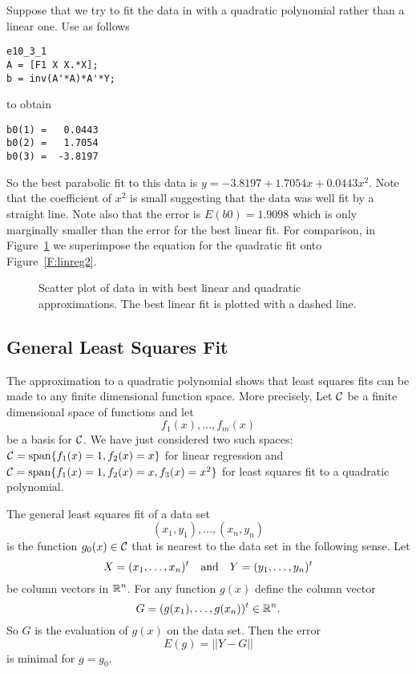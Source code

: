 \documentclass{ximera}
\begin{document}
Suppose that we try to fit the data in  with a quadratic
polynomial rather than a linear one.   Use \Matlab as follows
\begin{verbatim}
e10_3_1
A = [F1 X X.*X];
b = inv(A'*A)*A'*Y;
\end{verbatim}
to obtain
\begin{verbatim}
b0(1) =   0.0443
b0(2) =   1.7054
b0(3) =  -3.8197
\end{verbatim}
So the best parabolic fit
to this data is $y=-3.8197+1.7054x+0.0443x^2$.
Note that the coefficient of $x^2$ is small suggesting that the data was
well fit by a straight line.  Note also that the error is
$E(b0)=1.9098$ which
is only marginally smaller than the error for the best linear fit.  For
comparison, in Figure~\ref{F:linreg3} we superimpose the equation for the
quadratic fit onto Figure~\ref{F:linreg2}.
\begin{figure}[htb]
     \centerline{%
     }
     \caption{Scatter plot of data in \protect{} with best
	linear and quadratic approximations.  The best linear fit is plotted
	with a dashed line.}
     \label{F:linreg3}
\end{figure}



\subsection*{General Least Squares Fit}

The approximation to a quadratic polynomial shows that least squares
fits can be made to any finite dimensional
function space.  More precisely,
Let ${\cal C}$ be a finite dimensional space of functions and let
\[
f_1(x),\ldots,f_m(x)
\]
be a basis for ${\cal C}$.  We have just considered two such spaces:
${\cal C}={\rm span}\{f_1(x)=1,f_2(x)=x\}$ for
linear regression and
${\cal C}={\rm span}\{f_1(x)=1,f_2(x)=x,f_3(x)=x^2\}$ for
least squares fit to a
quadratic polynomial.

The general least squares fit of a data set
\[
(x_1,y_1),\ldots, (x_n,y_n)
\]
is the function $g_0(x)\in{\cal C}$ that is nearest to the data set in the
following sense.  Let
\[
X = (x_1,\ldots,x_n)^t \quad\mbox{and}\quad Y = (y_1,\ldots,y_n)^t
\]
be column vectors in $\mbox{$\Bbb{R}$}^n$.  For any function $g(x)$ define the column vector
\[
G = (g(x_1),\ldots,g(x_n))^t\in\mbox{$\Bbb{R}$}^n.
\]
So $G$ is the evaluation of $g(x)$ on the data set.  Then the error
\[
E(g) = ||Y-G||
\]
is minimal for $g=g_0$.
\end{document}
